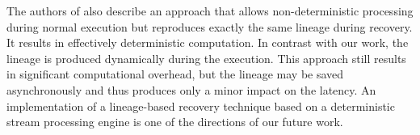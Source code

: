 The authors of \cite{Wang:2019:LSF:3341301.3359653} also describe an approach that allows non-deterministic processing during normal execution but reproduces exactly the same lineage during recovery.  It results in effectively deterministic computation. In contrast with our work, the lineage is produced dynamically during the execution. This approach still results in significant computational overhead, but the lineage may be saved asynchronously and thus produces only a minor impact on the latency. An implementation of a lineage-based recovery technique based on a deterministic stream processing engine is one of the directions of our future work.
